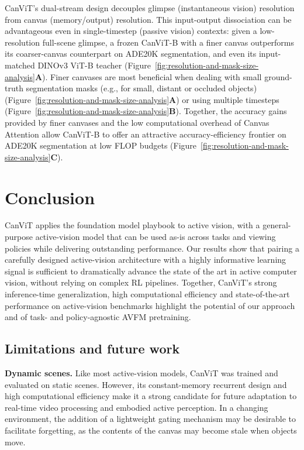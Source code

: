 \documentclass{article}
\begin{document}
CanViT's dual-stream design decouples glimpse (instantaneous vision) resolution from canvas (memory/output) resolution.
This input-output dissociation can be advantageous even in single-timestep (passive vision) contexts:
given a low-resolution full-scene glimpse, a frozen CanViT-B with a finer canvas outperforms its coarser-canvas counterpart on ADE20K segmentation,
and even its input-matched DINOv3 ViT-B teacher (Figure~\ref{fig:resolution-and-mask-size-analysis}\textbf{A}).
Finer canvases are most beneficial when dealing with small ground-truth segmentation masks (e.g., for small, distant or occluded objects) (Figure~\ref{fig:resolution-and-mask-size-analysis}\textbf{A})
or using multiple timesteps (Figure~\ref{fig:resolution-and-mask-size-analysis}\textbf{B}).
Together,
the accuracy gains provided by finer canvases
and the low computational overhead of Canvas Attention
allow CanViT-B to offer an attractive accuracy-efficiency frontier on ADE20K segmentation at low FLOP budgets (Figure~\ref{fig:resolution-and-mask-size-analysis}\textbf{C}).


\section{Conclusion}
\label{sec:conclusion}

CanViT applies the foundation model playbook to active vision,
with a general-purpose active-vision model
that can be used as-is across tasks and viewing policies
while delivering outstanding performance.
Our results show that pairing a carefully designed active-vision architecture
with a highly informative learning signal
is sufficient to dramatically advance the state of the art in active computer vision,
without relying on complex \ac{RL} pipelines.
Together, CanViT's strong inference-time generalization, high computational efficiency
and state-of-the-art performance on active-vision benchmarks
highlight the potential of our approach
and of task- and policy-agnostic \ac{AVFM} pretraining.

\subsection{Limitations and future work}
\label{subsec:limitations}

\textbf{Dynamic scenes.}
Like most active-vision models, CanViT was trained and evaluated on static scenes.
However, its constant-memory recurrent design and high computational efficiency
make it a strong candidate for future adaptation to real-time video processing and embodied active perception.
In a changing environment, the addition of a lightweight gating mechanism may be desirable to facilitate forgetting, as the contents of the canvas may become stale when objects move.
\end{document}
